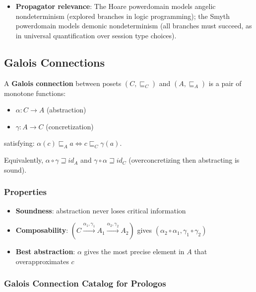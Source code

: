 \documentclass[11pt]{article}
\begin{document}
\begin{itemize}
\item \textbf{Propagator relevance}: The Hoare powerdomain models angelic nondeterminism
(explored branches in logic programming); the Smyth powerdomain models demonic
nondeterminism (all branches must succeed, as in universal quantification over
session type choices).
\end{itemize}
\subsection{Galois Connections}
\label{sec:orgcd58c8f}

A \textbf{Galois connection} between posets \((C, \sqsubseteq_C)\) and \((A, \sqsubseteq_A)\)
is a pair of monotone functions:

\begin{itemize}
\item \(\alpha : C \to A\) (abstraction)
\item \(\gamma : A \to C\) (concretization)
\end{itemize}

satisfying: \(\alpha(c) \sqsubseteq_A a \iff c \sqsubseteq_C \gamma(a)\).

Equivalently, \(\alpha \circ \gamma \sqsupseteq id_A\) and \(\gamma \circ \alpha
\sqsupseteq id_C\) (overconcretizing then abstracting is sound).
\subsubsection{Properties}
\label{sec:org6555695}

\begin{itemize}
\item \textbf{Soundness}: abstraction never loses critical information
\item \textbf{Composability}: \((C \xrightarrow{\alpha_1, \gamma_1} A_1 \xrightarrow{\alpha_2, \gamma_2} A_2)\) gives \((\alpha_2 \circ \alpha_1, \gamma_1 \circ \gamma_2)\)
\item \textbf{Best abstraction}: \(\alpha\) gives the most precise element in \(A\) that
overapproximates \(c\)
\end{itemize}
\subsubsection{Galois Connection Catalog for Prologos}
\label{sec:orgc647889}
\end{document}
